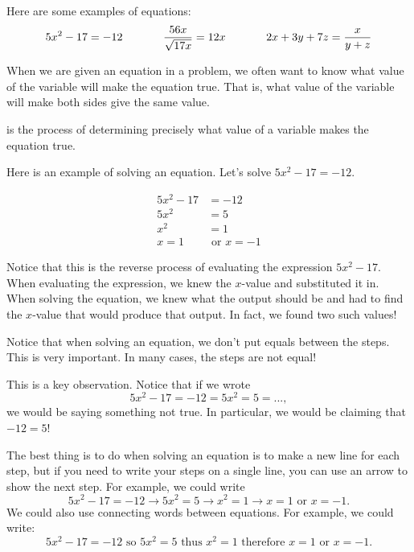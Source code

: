 \documentclass{ximera}
\begin{document}
Here are some examples of equations:
$$
5x^2-17=-12  \hspace{.5in}
\frac{56x}{\sqrt{17x}}=12x  \hspace{.5in}
2x+3y+7z=\frac{x}{y+z}
$$

When we are given an equation in a problem, we often want to know what value of the variable will make the equation true.  That is, what value of the variable will make both sides give the same value.

\begin{definition}
 is the process of determining precisely what value of a variable makes the equation true.
\end{definition}

Here is an example of solving an equation.  Let's solve $5x^2-17=-12$.

\begin{align*}
5x^2-17&=-12\\
5x^2&=5\\
x^2&=1\\
x=1 &\text{  or  }  x=-1
\end{align*}

Notice that this is the reverse process of evaluating the expression $5x^2-17$.  When evaluating the expression, we knew the $x$-value and substituted it in.  When solving the equation, we knew what the output should be and had to find the $x$-value that would produce that output.  In fact, we found two such values!

\begin{remark}
Notice that when solving an equation, we don't put equals between the steps.  This is very important.  In many cases, the steps are not equal! 
\end{remark}

This is a key observation.  Notice that if we wrote $$5x^2-17=-12=5x^2=5=...,$$ we would be saying something not true.  In particular, we would be claiming that $-12=5$!

The best thing is to do when solving an equation is to make a new line for each step, but if you need to write your steps on a single line, you can use an arrow to show the next step.  For example, we could write 
$$5x^2-17=-12 \rightarrow 5x^2=5 \rightarrow x^2=1 \rightarrow x=1 \text{  or  }  x=-1.$$  
We could also use connecting words between equations.  For example, we could write:
$$5x^2-17=-12 \text{ so } 5x^2=5 \text{ thus } x^2=1 \text{ therefore } x=1 \text{  or  }  x=-1.$$  
\end{document}
